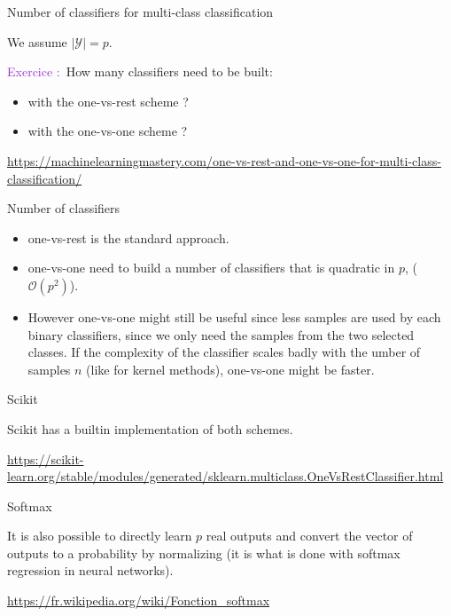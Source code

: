 \documentclass[usenames,dvipsnames,french]{beamer}
\newcounter{numexos}%
\newcommand{\exercice}[1]{%
\addtocounter{numexos}{1}%
\textcolor{DarkOrchid}{Exercice\,\thenumexos\,:}\,#1%
}
\begin{document}
\begin{frame}{Number of classifiers for multi-class classification}

    We assume $ | \mathcal{Y} | = p$.

    \exercice{\textbf{}}How many classifiers  need to be built:
    \begin{itemize}
        \item with the one-vs-rest scheme ?
        \item with the one-vs-one scheme ?
    \end{itemize}

\url{https://machinelearningmastery.com/one-vs-rest-and-one-vs-one-for-multi-class-classification/} 
\end{frame}

\begin{frame}{Number of classifiers}

    \begin{itemize}
        \item one-vs-rest is the standard approach.
        \item one-vs-one need to build a number of classifiers that is
            quadratic in $p$, ($\mathcal{O} (p^2)$).
        \item However one-vs-one might still be useful since less samples are
            used by each binary classifiers, since we only need the samples
            from the two selected classes. If the complexity of the classifier
            scales badly with the umber of samples $n$ (like for kernel
            methods), one-vs-one might be faster.
    \end{itemize}
    

\end{frame}

\begin{frame}{Scikit}

    Scikit has a builtin implementation of both schemes.

    \url{https://scikit-learn.org/stable/modules/generated/sklearn.multiclass.OneVsRestClassifier.html} 
    
\end{frame}

\begin{frame}{Softmax}

    It is also possible to directly learn $p$ real outputs and convert the vector of outputs to a probability by normalizing (it is what is done with softmax regression in neural networks).

    \url{https://fr.wikipedia.org/wiki/Fonction_softmax} 
\end{frame}
\end{document}
